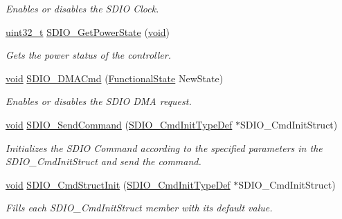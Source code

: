 \begin{DoxyCompactItemize}
\begin{DoxyCompactList}\small\item\em Enables or disables the S\+D\+IO Clock. \end{DoxyCompactList}\item 
\hyperlink{_p_e___types_8h_a33594304e786b158f3fb30289278f5af}{uint32\+\_\+t} \hyperlink{group___s_d_i_o___exported___functions_ga3a19de2c7cd51645702213f64a1758ed}{S\+D\+I\+O\+\_\+\+Get\+Power\+State} (\hyperlink{usb__devapi_8h_afabf60e7f57651d6d595a02c75f07cd0}{void})
\begin{DoxyCompactList}\small\item\em Gets the power status of the controller. \end{DoxyCompactList}\item 
\hyperlink{usb__devapi_8h_afabf60e7f57651d6d595a02c75f07cd0}{void} \hyperlink{group___s_d_i_o___exported___functions_gad36fde5ec0ce0c2089b9d971c2271e6e}{S\+D\+I\+O\+\_\+\+D\+M\+A\+Cmd} (\hyperlink{agilefox_2library_2inc_2stm32f10x__type_8h_ac9a7e9a35d2513ec15c3b537aaa4fba1}{Functional\+State} New\+State)
\begin{DoxyCompactList}\small\item\em Enables or disables the S\+D\+IO D\+MA request. \end{DoxyCompactList}\item 
\hyperlink{usb__devapi_8h_afabf60e7f57651d6d595a02c75f07cd0}{void} \hyperlink{group___s_d_i_o___exported___functions_ga7117d2f702703f6c0a66bc07707cab23}{S\+D\+I\+O\+\_\+\+Send\+Command} (\hyperlink{struct_s_d_i_o___cmd_init_type_def}{S\+D\+I\+O\+\_\+\+Cmd\+Init\+Type\+Def} $\ast$S\+D\+I\+O\+\_\+\+Cmd\+Init\+Struct)
\begin{DoxyCompactList}\small\item\em Initializes the S\+D\+IO Command according to the specified parameters in the S\+D\+I\+O\+\_\+\+Cmd\+Init\+Struct and send the command. \end{DoxyCompactList}\item 
\hyperlink{usb__devapi_8h_afabf60e7f57651d6d595a02c75f07cd0}{void} \hyperlink{group___s_d_i_o___exported___functions_ga09d9e89f49c87c82aec79c97b7068e24}{S\+D\+I\+O\+\_\+\+Cmd\+Struct\+Init} (\hyperlink{struct_s_d_i_o___cmd_init_type_def}{S\+D\+I\+O\+\_\+\+Cmd\+Init\+Type\+Def} $\ast$S\+D\+I\+O\+\_\+\+Cmd\+Init\+Struct)
\begin{DoxyCompactList}\small\item\em Fills each S\+D\+I\+O\+\_\+\+Cmd\+Init\+Struct member with its default value. \end{DoxyCompactList}\item 

\end{DoxyCompactItemize}
